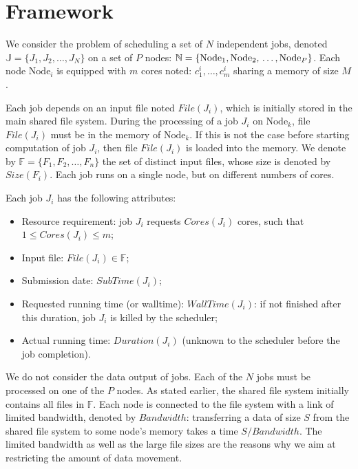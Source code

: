 \documentclass[sigconf,review,anonymous]{acmart}
\newcommand{\Node}[1]{\ensuremath{\mathrm{Node}_{#1}}\xspace}
\newcommand{\file}{\ensuremath{\mathit{File}}\xspace}
\newcommand{\size}{\ensuremath{\mathit{Size}}\xspace}
\newcommand{\memory}{\ensuremath{\mathit{M}}\xspace}
\newcommand{\duration}{\mathit{Duration}\xspace}
\newcommand{\bandwidth}{\mathit{Bandwidth}\xspace}
\newcommand{\core}{\mathit{Cores}\xspace}
\newcommand{\submissiontime}{\mathit{SubTime}\xspace}
\newcommand{\walltime}{\mathit{WallTime}\xspace}
\newcommand{\fileset}{\ensuremath{\mathbb{F}}\xspace}
\newcommand{\jobset}{\ensuremath{\mathbb{J}}\xspace}
\newcommand{\nodeset}{\ensuremath{\mathbb{N}}\xspace}
\begin{document}
\section{Framework}\label{sec.framework}

We consider the problem of scheduling a set of $N$ independent jobs,
denoted $\jobset = \{J_1, J_2, \ldots, J_N\}$ on a set of $P$ nodes:
$\nodeset = \{\Node{1}, \Node{2}, \\ \ldots, \Node{P}\}$.
Each node $\Node{i}$ is equipped with $m$ cores noted:
$c^i_1,\ldots,c^i_m$ sharing a memory of size $\memory$.

Each job depends on an input file noted $\file(J_i)$, which is
initially stored in the main shared file system.  During the
processing of a job $J_i$ on $\Node{k}$, file $\file(J_i)$ must be in
the memory of $\Node{k}$. If this is not the case before starting
computation of job $J_i$, then file $\file(J_i)$ is loaded into the
memory.  We denote by $\fileset = \{F_1, F_2, \ldots, F_n\}$ the set
of distinct input files, whose size is denoted by $\size(F_i)$. Each
job runs on a single node, but on different numbers of cores.



Each job $J_i$ has the following attributes:
\begin{itemize}
\item Resource requirement: job $J_i$ requests $\core(J_i)$  cores, such that $1 \leq \core(J_i) \leq m$;
\item Input file: $\file(J_i) \in \fileset$;
\item Submission date: $\submissiontime(J_i)$;
\item Requested running time (or walltime): $\walltime(J_i)$: if not
  finished after this duration, job $J_i$ is killed by the scheduler;
\item Actual running time: $\duration(J_i)$ (unknown to  the scheduler
  before the job completion).
\end{itemize}

We do not consider the data output of jobs.
Each of the $N$ jobs must be processed on one of the $P$ nodes.  As
stated earlier, the shared file system initially contains all files
in $\fileset$.  Each node is connected to the file system with a link
of limited bandwidth, denoted by $\bandwidth$: transferring a data of
size $S$ from the shared file system to some node's memory takes a
time $S/\bandwidth$.
The limited bandwidth
as well as the large file sizes are the reasons why we aim at
restricting the amount of data movement.
\end{document}
